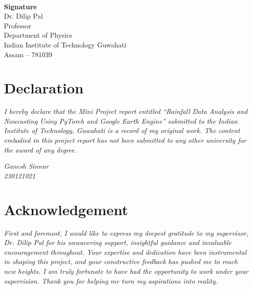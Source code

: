 \documentclass[12pt, a4paper]{report}
\begin{document}
\begin{center}
    \vspace{28mm}

    \begin{flushleft}
    \begin{minipage}{0.60\textwidth}
        \hrulefill\\[2mm]
        \textbf{Signature}\\[2mm]
        Dr. Dilip Pal\\
        Professor\\
        Department of Physics\\
        Indian Institute of Technology Guwahati\\
        Assam -- 781039
    \end{minipage}
    \end{flushleft}

\end{center}

\clearpage


\chapter*{Declaration}
\vspace{1cm}

\noindent
\textit{
I hereby declare that the Mini Project report entitled ``Rainfall Data Analysis and Nowcasting Using PyTorch and Google Earth Engine'' submitted to the Indian Institute of Technology, Guwahati is a record of my original work. The content embodied in this project report has not been submitted to any other university for the award of any degree.
}

\vspace{2cm}

\begin{flushright}
\textit{Ganesh Sinnur\\
230121021}
\end{flushright}

\clearpage


\chapter*{Acknowledgement}
\vspace{1cm}

\noindent
\textit{First and foremost, I would like to express my deepest gratitude to my supervisor, Dr. Dilip Pal for his unwavering support, insightful guidance and invaluable encouragement throughout. Your expertise and dedication have been instrumental in shaping this project, and your constructive feedback has pushed me to reach new heights. I am truly fortunate to have had the opportunity to work under your supervision. Thank you for helping me turn my aspirations into reality.
}
\end{document}
